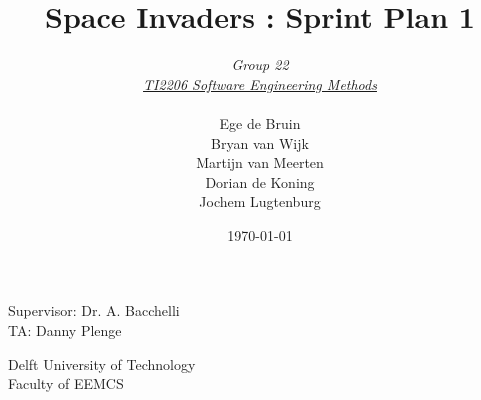 \documentclass[10pt]{article}
\begin{document}
\title{Space Invaders : Sprint Plan 1}
\date{\today}
\author{\textit{Group 22}\\ \textit{\underline{TI2206 Software Engineering Methods}} \\
 \\Ege de Bruin \\ Bryan van Wijk \\ Martijn van Meerten \\ Dorian de Koning \\ Jochem Lugtenburg }
 \maketitle  
 \begin{center}
Supervisor: Dr. A. Bacchelli\\
TA: Danny Plenge\\
 \end{center}     
 \begin{center}
 Delft University of Technology\\
 Faculty of EEMCS\\
 \end{center}
 \thispagestyle{empty}
 \pagebreak
 
\end{document}
